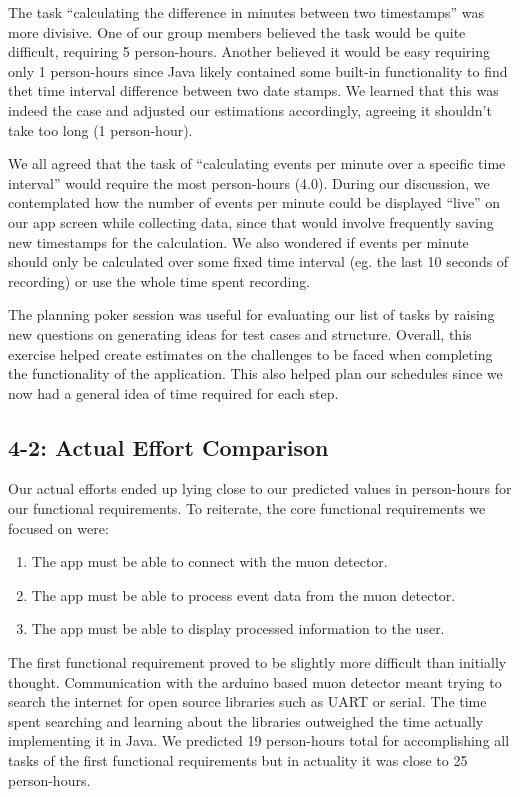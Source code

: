 \documentclass[11pt,a4paper]{article}
\begin{document}
The task “calculating the difference in minutes between two timestamps” was more divisive. One of our group members believed the task would be quite difficult, requiring 5 person-hours. Another believed it would be easy requiring only 1 person-hours since Java likely contained some built-in functionality to find thet time interval difference between two date stamps. We learned that this was indeed the case and adjusted our estimations accordingly, agreeing it shouldn't take too long (1 person-hour).

We all agreed that the task of “calculating events per minute over a specific time interval” would require the most person-hours (4.0). During our discussion, we contemplated how the number of events per minute could be displayed “live” on our app screen while collecting data, since that would involve frequently saving new timestamps for the calculation. We also wondered if events per minute should only be calculated over some fixed time interval (eg. the last 10 seconds of recording) or use the whole time spent recording.

The planning poker session was useful for evaluating our list of tasks by raising new questions on generating ideas for test cases and structure. Overall, this exercise helped create estimates on the challenges to be faced when completing the functionality of the application. This also helped plan our schedules since we now had a general idea of time required for each step. 

\subsection*{4-2: Actual Effort Comparison}

Our actual efforts ended up lying close to our predicted values in person-hours for our functional requirements. To reiterate, the core functional requirements we focused on were:

\begin{enumerate}
  \item The app must be able to connect with the muon detector.
  \item The app must be able to process event data from the muon detector.
  \item The app must be able to display processed information to the user.
\end{enumerate}

The first functional requirement proved to be slightly more difficult than initially thought. Communication with the arduino based muon detector meant trying to search the internet for open source libraries such as UART or serial. The time spent searching and learning about the libraries outweighed the time actually implementing it in Java. We predicted 19 person-hours total for accomplishing all tasks of the first functional requirements but in actuality it was close to 25 person-hours.
\end{document}
